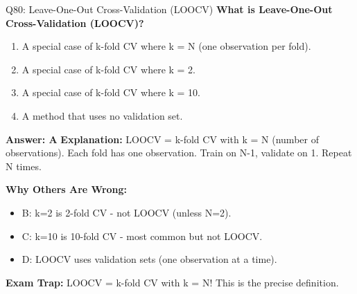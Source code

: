 \documentclass[8pt]{beamer}
\begin{document}
	\begin{frame}{Q80: Leave-One-Out Cross-Validation (LOOCV)}
		\fontsize{6.5}{7.5}\selectfont
		\textbf{What is Leave-One-Out Cross-Validation (LOOCV)?}
		
		\begin{enumerate}
			\item A special case of k-fold CV where k = N (one observation per fold).
			\item A special case of k-fold CV where k = 2.
			\item A special case of k-fold CV where k = 10.
			\item A method that uses no validation set.
		\end{enumerate}
		
		\vspace{0.05cm}
		\textcolor{myblue}{\textbf{Answer: A}}
		\vspace{0.05cm}
		\textcolor{myblue}{\textbf{Explanation:}} LOOCV = k-fold CV with k = N (number of observations). Each fold has one observation. Train on N-1, validate on 1. Repeat N times.
		
		\vspace{0.05cm}
		\textcolor{myred}{\textbf{Why Others Are Wrong:}}
		\begin{itemize}
			\item \textcolor{myred}{B:} k=2 is 2-fold CV - not LOOCV (unless N=2).
			\item \textcolor{myred}{C:} k=10 is 10-fold CV - most common but not LOOCV.
			\item \textcolor{myred}{D:} LOOCV uses validation sets (one observation at a time).
		\end{itemize}
		
		\textcolor{myred}{\textbf{Exam Trap:}} LOOCV = \textcolor{myblue}{k-fold CV with k = N}! This is the precise definition.
	\end{frame}
	
\end{document}
